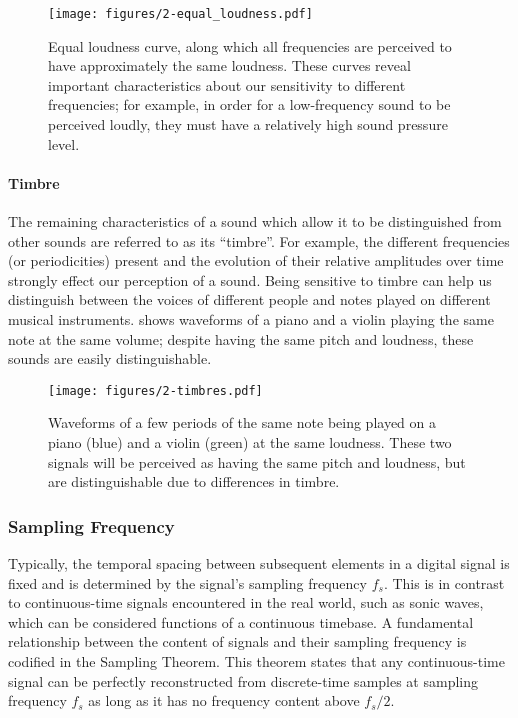 \begin{figure}
  \centering
  \texttt{[image: figures/2-equal\_loudness.pdf]}
  \caption[Equal loudness curve]{Equal loudness curve, along which all frequencies are perceived to have approximately the same loudness.
  These curves reveal important characteristics about our sensitivity to different frequencies; for example, in order for a low-frequency sound to be perceived loudly, they must have a relatively high sound pressure level.}
  \label{fig:equal_loudness}
\end{figure}

\paragraph{Timbre}

The remaining characteristics of a sound which allow it to be distinguished from other sounds are referred to as its ``timbre''.
For example, the different frequencies (or periodicities) present and the evolution of their relative amplitudes over time strongly effect our perception of a sound.
Being sensitive to timbre can help us distinguish between the voices of different people and notes played on different musical instruments.
 shows waveforms of a piano and a violin playing the same note at the same volume; despite having the same pitch and loudness, these sounds are easily distinguishable.

\begin{figure}
  \centering
  \texttt{[image: figures/2-timbres.pdf]}
  \caption[Waveforms of piano and violin]{Waveforms of a few periods of the same note being played on a piano (blue) and a violin (green) at the same loudness.
  These two signals will be perceived as having the same pitch and loudness, but are distinguishable due to differences in timbre.}
  \label{fig:timbres}
\end{figure}

\subsubsection{Sampling Frequency}

Typically, the temporal spacing between subsequent elements in a digital signal is fixed and is determined by the signal's sampling frequency $f_s$.
This is in contrast to continuous-time signals encountered in the real world, such as sonic waves, which can be considered functions of a continuous timebase.
A fundamental relationship between the content of signals and their sampling frequency is codified in the Sampling Theorem.
This theorem states that any continuous-time signal can be perfectly reconstructed from discrete-time samples at sampling frequency $f_s$ as long as it has no frequency content above $f_s/2$.

